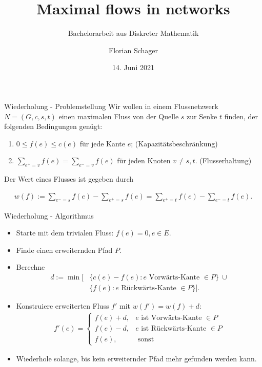 \documentclass[aspectratio=169]{beamer}
\title[Maximum Flow Problem]{Maximal flows in networks}
\subtitle{Bachelorarbeit aus Diskreter Mathematik}
\author[F. Schager]{Florian Schager}
\institute[TU Wien]{TU Wien, Vienna, Austria}
\date{14. Juni 2021}
\begin{document}
\begin{frame}
    \titlepage
\end{frame}


\begin{frame}{Wiederholung - Problemstellung}
  Wir wollen in einem Flussnetzwerk $N = (G,c,s,t)$ einen maximalen Fluss 
  von der Quelle $s$ zur Senke $t$ finden, der folgenden Bedingungen genügt:

  \begin{enumerate}
    \item $0 \leq f(e) \leq c(e)$ für jede Kante $e$; \quad (Kapazitätsbeschränkung)
    \item $\sum_{e^+ = v} f(e) = \sum_{e^- = v} f(e)$ für jeden Knoten $v \neq s,t$.
    \quad (Flusserhaltung)
  \end{enumerate}



  Der Wert eines Flusses ist gegeben durch

  \begin{align*}
    w(f) := \sum_{e^- = s}f(e) - \sum_{e^+ = s} f(e) = \sum_{e^+ = t}f(e) - \sum_{e^- = t} f(e).
  \end{align*}

\end{frame}


\begin{frame}{Wiederholung - Algorithmus}

  \begin{algorithmus*}
    \begin{itemize}
      \item Starte mit dem trivialen Fluss: $f(e) = 0 , e \in E$.
      \item Finde einen erweiternden Pfad $P$.
      \item Berechne
      \begin{align*}
        d := \min[&\{c(e) - f(e): e \text{ Vorwärts-Kante } \in P\} \ \cup \\
        &\{f(e): e \text{ Rückwärts-Kante } \in P\} ].
      \end{align*}
      \item Konstruiere erweiterten Fluss $f'$ mit $w(f') = w(f) + d$:
      \begin{align*}
        f'(e) = \begin{cases}
          f(e) + d, & e \text{ ist Vorwärts-Kante } \in P \\
          f(e) - d, & e \text{ ist Rückwärts-Kante } \in P\\
          f(e), & \text{ sonst}
        \end{cases}
      \end{align*}
      \item Wiederhole solange, bis kein erweiternder Pfad mehr gefunden werden kann.
    \end{itemize}
  \end{algorithmus*}

\end{frame}
\end{document}

